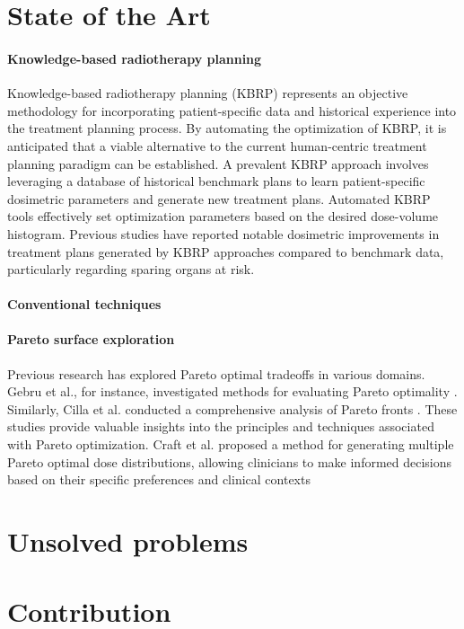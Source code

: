 \section{State of the Art}
\paragraph{Knowledge-based radiotherapy planning}
Knowledge-based radiotherapy planning (KBRP) represents an objective methodology for incorporating patient-specific data and historical experience into the treatment planning process.
By automating the optimization of KBRP, it is anticipated that a viable alternative to the current human-centric treatment planning paradigm can be established.
A prevalent KBRP approach involves leveraging a database of historical benchmark plans to learn patient-specific dosimetric parameters and generate new treatment plans.
Automated KBRP tools effectively set optimization parameters based on the desired dose-volume histogram.
Previous studies have reported notable dosimetric improvements in treatment plans generated by KBRP approaches compared to benchmark data, particularly regarding sparing organs at risk.

\paragraph{Conventional techniques}

\paragraph{Pareto surface exploration}
Previous research has explored Pareto optimal tradeoffs in various domains.
Gebru et al., for instance, investigated methods for evaluating Pareto optimality \cite{Gebru2023}.
Similarly, Cilla et al. conducted a comprehensive analysis of Pareto fronts \cite{Cilla2018}.
These studies provide valuable insights into the principles and techniques associated with Pareto optimization.
Craft et al. proposed a method for generating multiple Pareto optimal dose distributions, allowing clinicians to make informed decisions based on their specific preferences and clinical contexts \cite{Craft2007}

\section{Unsolved problems}

\section{Contribution}
